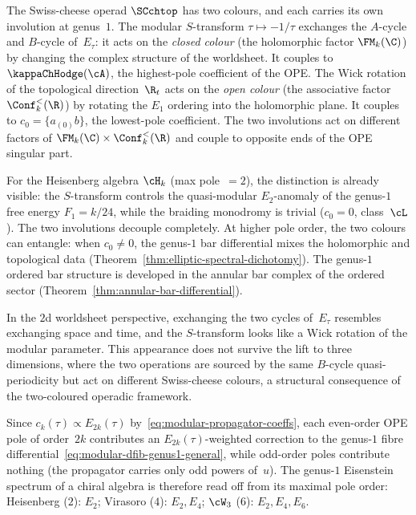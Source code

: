 \begin{warning}%
\label{warn:s-transform-not-wick}%
%
%
The Swiss-cheese operad $\SCchtop$ has two colours, and each
carries its own involution at genus~$1$. The modular
$S$-transform $\tau \mapsto -1/\tau$ exchanges the $A$-cycle
and $B$-cycle of~$E_\tau$: it acts on the \emph{closed colour}
(the holomorphic factor $\FM_k(\C)$) by changing the
complex structure of the worldsheet. It couples
to~$\kappaChHodge(\cA)$, the highest-pole coefficient of the OPE.
The Wick rotation of the topological direction~$\R_t$ acts on
the \emph{open colour}
(the associative factor $\Conf_k^{<}(\R)$) by rotating the $E_1$ ordering
into the holomorphic plane. It couples to
$c_0 = \{a_{(0)}b\}$, the lowest-pole coefficient.
The two involutions act on different factors of
$\FM_k(\C) \times \Conf_k^{<}(\R)$ and couple to opposite
ends of the OPE singular part.

For the Heisenberg algebra $\cH_k$ (max pole~$= 2$), the
distinction is already visible: the $S$-transform controls
the quasi-modular $E_2$-anomaly of the genus-$1$ free
energy $F_1 = k/24$, while the braiding monodromy is
trivial ($c_0 = 0$, class~$\cL$). The two involutions
decouple completely. At higher pole order, the two colours
can entangle: when $c_0 \ne 0$, the genus-$1$ bar
differential mixes the holomorphic and topological data
\textup{(}Theorem~\textup{\ref{thm:elliptic-spectral-dichotomy})}.
The genus-$1$ ordered bar structure is developed in the annular
bar complex of the ordered sector
\textup{(}Theorem~\textup{\ref{thm:annular-bar-differential})}.

In the $2$d worldsheet perspective, exchanging the two
cycles of~$E_\tau$ resembles exchanging space and time, and
the $S$-transform looks like a Wick rotation of the modular
parameter. This appearance does not survive the lift to
three dimensions, where the two operations are sourced by
the same $B$-cycle quasi-periodicity but act on different
Swiss-cheese colours, a structural consequence of the
two-coloured operadic framework.
\end{warning}

\begin{observation}%
\label{obs:pole-eisenstein-pairing}%
%
Since $c_k(\tau) \propto E_{2k}(\tau)$
by~\eqref{eq:modular-propagator-coeffs}, each even-order OPE
pole of order~$2k$ contributes an $E_{2k}(\tau)$-weighted
correction to the genus-$1$ fibre
differential~\eqref{eq:modular-dfib-genus1-general}, while
odd-order poles contribute nothing (the propagator carries only
odd powers of~$u$). The genus-$1$ Eisenstein spectrum of a
chiral algebra is therefore read off from its maximal pole order:
Heisenberg ($2$): $E_2$;\;
Virasoro ($4$): $E_2, E_4$;\;
$\cW_3$ ($6$): $E_2, E_4, E_6$.
\end{observation}

